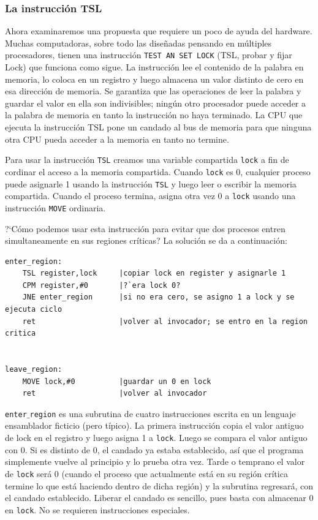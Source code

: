 \documentclass{article}
\begin{document}
\subsubsection*{La instrucci\'on TSL}
Ahora examinaremos una propuesta que requiere un poco de ayuda del hardware. 
Muchas computadoras, sobre todo las dise\~nadas pensando en m\'ultiples 
procesadores, tienen una instrucci\'on {\tt TEST AN SET LOCK} (TSL, probar y 
fijar Lock) que funciona como sigue. La instrucci\'on lee el contenido de la 
palabra en memoria, lo coloca en un registro y luego almacena un valor 
distinto de cero en esa direcci\'on de memoria. Se garantiza que las 
operaciones de leer la palabra y guardar el valor en ella son indivisibles; 
ning\'un otro procesador puede acceder a la palabra de memoria en tanto la 
instrucci\'on no haya terminado. La CPU que ejecuta la instrucci\'on TSL
pone un candado al bus de memoria para que ninguna otra CPU pueda acceder 
a la memoria en tanto no termine.

Para usar la instrucci\'on {\tt TSL} creamos una variable compartida {\tt lock} 
a f\/in de cordinar el acceso a la memoria compartida. Cuando {\tt lock} es 
0, cualquier proceso puede asignarle 1 usando la instrucci\'on {\tt TSL} y 
luego leer o escribir la memoria compartida. Cuando el proceso termina, 
asigna otra vez 0 a {\tt lock} usando una instrucci\'on {\tt MOVE} ordinaria.

?`C\'omo podemos usar esta instrucci\'on para evitar que dos procesos 
entren simultaneamente en sus regiones cr\'iticas? La soluci\'on se da a 
continuaci\'on:
\begin{verbatim}
enter_region:
    TSL register,lock     |copiar lock en register y asignarle 1
    CPM register,#0       |?`era lock 0?
    JNE enter_region      |si no era cero, se asigno 1 a lock y se ejecuta ciclo
    ret                   |volver al invocador; se entro en la region critica


leave_region:
    MOVE lock,#0          |guardar un 0 en lock
    ret                   |volver al invocador
\end{verbatim}
{\tt enter$\_$region} es una subrutina de cuatro instrucciones escrita 
en un lenguaje ensamblador f\/icticio (pero t\'ipico). La primera instrucci\'on 
copia el valor antiguo de lock en el registro y luego asigna 1 a {\tt lock}. 
Luego se compara el valor antiguo con 0. Si es distinto de 0, el candado ya 
estaba establecido, as\'i que el programa simplemente vuelve al principio 
y lo prueba otra vez. Tarde o temprano el valor de {\tt lock} ser\'a 0 
(cuando el proceso que actualmente est\'a en su regi\'on cr\'itica termine 
lo que est\'a haciendo dentro de dicha regi\'on) y la subrutina regresar\'a, 
con el candado establecido. Liberar el candado es sencillo, pues basta con 
almacenar 0 en {\tt lock}. No se requieren instrucciones especiales.
\end{document}
